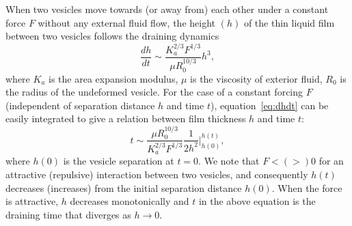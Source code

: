 \documentclass[aps,prl,twocolumn,showpacs,amsmath,amssymb]{revtex4-1}
\begin{document}
When two vesicles move towards (or away from) each other under a constant force $F$ without any external fluid flow, the height  $(h)$ of the thin liquid film between two vesicles follows the
draining dynamics \cite{RamachandranLeal2010_PoF}
\begin{equation}
\label{eq:dhdt}
\frac{d h}{dt} \sim \frac{K_a^{2/3} F^{1/3}}{\mu R_0^{10/3}} h^3,
\end{equation}
where $K_a$ is the area expansion modulus, $\mu$ is the viscosity of exterior fluid, $R_0$ is the radius of the undeformed vesicle.
For the case of a constant forcing $F$ (independent of separation distance $h$ and time $t$), equation~\ref{eq:dhdt} can be easily integrated to give
a relation between film thickness $h$ and time $t$:
\begin{equation}
t \sim \frac{\mu R_0^{10/3}}{K_a^{2/3} F^{1/3}}\frac{1}{2 h^2} \bigg|^{h(t)}_{h(0)},
\end{equation}
where $h(0)$ is the vesicle separation at $t=0$.
We note that $F< (>) 0$ for an attractive  (repulsive) interaction between two vesicles,  and consequently $h(t)$ decreases (increases) from  the initial separation distance $h(0)$. 
When the force is attractive, $h$ decreases monotonically and $t$ in the above
equation is the
draining time that diverges as $h\rightarrow 0$.
\end{document}
